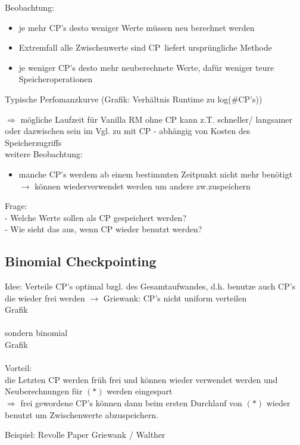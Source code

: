 Beobachtung:
\begin{itemize}
	\item je mehr CP's desto weniger Werte müssen neu berechnet werden
	\item Extremfall \glqq alle Zwischenwerte sind CP\grqq\ liefert ursprüngliche Methode
	\item je weniger CP's desto mehr neuberechnete Werte, dafür weniger teure Speicheroperationen
\end{itemize}

Typische Perfomanzkurve (Grafik: Verhältnis Runtime zu log(\#CP's))\\
\vspace{3cm}

\noindent
$\Rightarrow$ mögliche Laufzeit für Vanilla RM ohne CP kann z.T. schneller/ langsamer oder dazwischen sein im Vgl. zu mit CP - abhängig von Kosten des Speicherzugriffs\\

\noindent weitere Beobachtung:
\begin{itemize}
	\item manche CP's werdem ab einem bestimmten Zeitpunkt nicht mehr benötigt $\rightarrow$ können wiederverwendet werden um andere zw.zuspeichern
\end{itemize}
Frage:\\
- Welche Werte sollen als CP gespeichert werden?\\
- Wie sieht das aus, wenn CP wieder benutzt werden?

\subsection{Binomial Checkpointing}
\label{subsec:binCP}
Idee: Verteile CP's optimal bzgl. des Gesamtaufwandes, d.h. benutze auch CP's die wieder frei werden
$\rightarrow$ Griewank: CP's nicht uniform verteilen\\
Grafik\\\\
sondern binomial\\
Grafik\\\\
Vorteil:\\
die Letzten CP werden früh frei und können wieder verwendet werden und Neuberechnungen für $(*)$ werden eingespart\\
$\Rightarrow$ frei gewordene CP's können dann beim ersten Durchlauf von $(*)$ wieder benutzt um Zwischenwerte abzuspeichern.

Beispiel: Revolle Paper Griewank / Walther 







